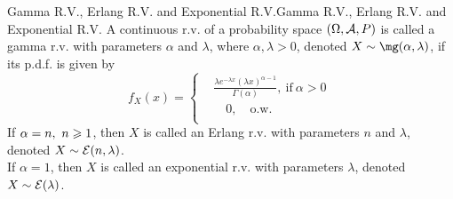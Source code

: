 \documentclass{elegantbook}
\begin{document}
\begin{definition}{Gamma R.V., Erlang R.V. and Exponential R.V.}{Gamma R.V., Erlang R.V. and Exponential R.V.}
A continuous r.v. of a probability space $(\Omega,\mathcal{A}, P)$ is called a gamma r.v. with parameters $\alpha$ and $\lambda$, where $\alpha,\lambda>0$, denoted $X\sim \mg(\alpha,\lambda)$, if its p.d.f. is given by
\[f_{X}(x) = \left\{ \begin{aligned}
&\frac{\lambda e^{- \lambda x}{(\lambda x)}^{\alpha - 1}}{\Gamma( \alpha )},\ \mathrm{\text{if}}\ \alpha > 0 \\
&\quad0,\quad\mathrm{\text{o.w.}} \\
\end{aligned} \right.\ \]
If $\alpha=n,\ n\geqslant1$, then $X$ is called an Erlang r.v. with parameters $n$ and $\lambda$, denoted $X\sim\mathcal{E}(n,\lambda)$.\\
If $\alpha=1$, then $X$ is called an exponential r.v. with parameters $\lambda$, denoted $X\sim\mathcal{E}(\lambda)$.
\end{definition}
\end{document}
